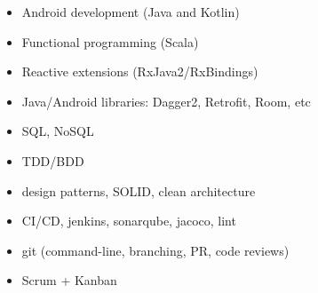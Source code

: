 \begin{multicols}{2}
    \begin{itemize}
	    \item Android development (Java and Kotlin)
	    \item Functional programming (Scala)
	    \item Reactive extensions (RxJava2/RxBindings) 
	    \item Java/Android libraries: Dagger2, Retrofit, Room, etc
	    \item SQL, NoSQL
	    \item TDD/BDD
	    \item design patterns, SOLID, clean architecture
	    \item CI/CD, jenkins, sonarqube, jacoco, lint
	    \item git (command-line, branching, PR, code reviews)
	    \item Scrum + Kanban
    \end{itemize}
 \end{multicols}
